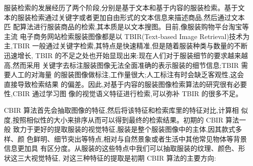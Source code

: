 服装检索的发展经历了两个阶段,分别是基于文本和基于内容的服装检索。基于文
本的服装检索通过关键字或者更加自由形式的文本信息来描述商品,然后通过文本匹
配算法进行服装商品的检索,其本质是以文本搜图。目前,像服装购物平台淘宝等主流
电子商务网站检索服装图像都是以 TBIR(Text-based Image Retrieval)技术为主,TBIR
一般通过关键字检索,其特点是快速精准,但是随着服装种类与数量的不断迅速增长,
TBIR 的不足之处也开始显现出来:现在人们对于服装细节的要求越来越高,然而采用
关键字去标注服装图像无法全面准确的表示服装的细节信息;TBIR 需要人工的对海量
的服装图像做标注,工作量很大;人工标注有时会缺乏客观性,这会直接导致检索结果
的偏差。因此,对基于内容的服装图像检索算法的研究很有必要性,CBIR 通过学习图
像的视觉语义特征进行检索,可以弥补 TBIR 的很多不足。

CBIR 算法首先会抽取图像的特征,然后将该特征和检索库里的特征对比,计算相
似度,按照相似性的大小来排序从而可以得到最终的检索结果。初期的 CBIR 算法一般
致力于更好的提取服装的视觉特征,服装是整个服装图像中的主体,因其款式多样、颜
色鲜明、细节突出等特点,相对与自然景象或者生活中其他常见物体等背景信息更加具
有区分度。从服装的这些特点中我们可以抽取服装的纹理、颜色、形状这三大视觉特征,
对这三种特征的提取是初期 CBIR 算法的主要方向:
